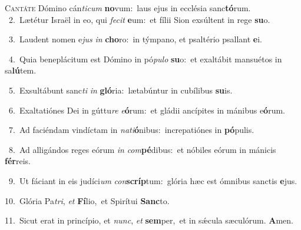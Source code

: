 \lettrine{\initial\textcolor{\initialcolor}{C}}{antáte} Dómino cán\-\textit{ti}\-\textit{cum} \textbf{no}\-vum:~\star laus ejus in ecclésia sanc\-\textbf{tó}\-rum.\\
{\numbfont\textcolor{\numbcolor}{~2.}}~Lætétur Israël in eo, qui \textit{fe}\-\textit{cit} \textbf{e}\-um:~\star et fílii Sion exsúltent in rege \textbf{su}\-o.\par
{\numbfont\textcolor{\numbcolor}{~3.}}~Laudent nomen e\textit{jus} \textit{in} \textbf{cho}\-ro:~\star in týmpano, et psaltério psallant \textbf{e}\-i.\par
{\numbfont\textcolor{\numbcolor}{~4.}}~Quia beneplácitum est Dómino in pó\-\textit{pu}\-\textit{lo} \textbf{su}\-o:~\star et exaltábit mansuétos in sa\-\textbf{lú}\-tem.\par
{\numbfont\textcolor{\numbcolor}{~5.}}~Exsultábunt sanc\textit{ti} \textit{in} \textbf{gló}\-ria:~\star lætabúntur in cubílibus \textbf{su}\-is.\par
{\numbfont\textcolor{\numbcolor}{~6.}}~Exaltatiónes Dei in gúttu\textit{re} \textit{e}\-\textbf{ó}rum:~\star et gládii ancípites in mánibus e\-\textbf{ó}\-rum.\par
{\numbfont\textcolor{\numbcolor}{~7.}}~Ad faciéndam vindíctam in \textit{na}\-\textit{ti}\textbf{ó}nibus:~\star increpatiónes in \textbf{pó}\-pulis.\par
{\numbfont\textcolor{\numbcolor}{~8.}}~Ad alligándos reges eórum \textit{in} \textit{com}\-\textbf{pé}dibus:~\star et nóbiles eórum in mánicis \textbf{fér}\-reis.\par
{\numbfont\textcolor{\numbcolor}{~9.}}~Ut fáciant in eis judíci\textit{um} \textit{con}\-\textbf{scríp}tum:~\star glória hæc est ómnibus sanctis \textbf{e}\-jus.\par
{\numbfont\textcolor{\numbcolor}{10.}}~Glória Pa\-\textit{tri}\-, \textit{et} \textbf{Fí}\-lio,~\star et Spirítui \textbf{Sanc}\-to.\par
{\numbfont\textcolor{\numbcolor}{11.}}~Sicut erat in princípio, et \textit{nunc}\-, \textit{et} \textbf{sem}\-per,~\star et in sǽcula sæculórum. \textbf{A}\-men.\par
